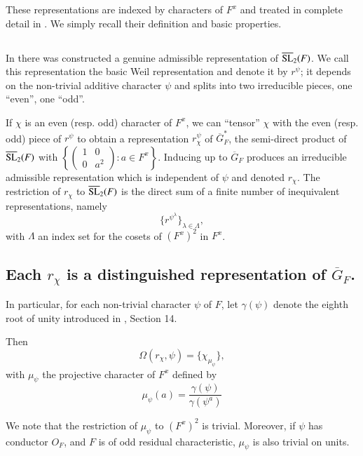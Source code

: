 These representations are indexed by characters of $F^{x}$ and treated in complete detail in \cite{Ge PS2}. We simply recall their definition and basic properties.

\subsection{}\label{art1-sec4.1}
In \cite{Weil} there was constructed a genuine admissible representation of $\overline{\mathrm{SL}}_{2}(F)$. We call this representation the basic Weil representation and denote it by $r^{\psi}$; it depends on the non-trivial additive character $\psi$ and splits into two irreducible pieces, one ``even'', one ``odd''.

If $\chi$ is an even (resp. odd) character of $F^{x}$, we can ``tensor'' $\chi$ with the even (resp. odd) piece of $r^{\psi}$ to obtain a representation $r^{\psi}_{\chi}$ of $\overline{G}_{F}^{*}$, the semi-direct product of $\overline{\mathrm{SL}}_{2}(F)$ with $\left\{\left(\begin{smallmatrix} 1 & 0\\ 0 & a^{2}\end{smallmatrix}\right):a\in F^{x}\right\}$. Inducing up to $\overline{G}_{F}$ produces an irreducible admissible representation which is independent of $\psi$ and denoted $r_{\chi}$. The restriction of $r_{\chi}$ to $\overline{\mathrm{SL}}_{2}(F)$ is the direct sum of a finite number of inequivalent representations, namely
$$
\{r^{\psi^{\lambda}}\}_{\lambda\in \Lambda},
$$
with $\Lambda$ an index set for the cosets of $(F^{x})^{2}$ in $F^{x}$.

\subsection{Each $r_{\chi}$ is a distinguished representation of $\overline{G}_{F}$.}\label{art1-sec4.2}
In particular, for each non-trivial character $\psi$ of $F$, let $\gamma(\psi)$ denote the eighth root of unity introduced in \cite{Weil}, Section 14.

Then
$$
\Omega(r_{\chi},\psi)=\{\chi_{\mu_{\psi}}\},
$$
with $\mu_{\psi}$ the projective character of $F^{x}$ defined by
\setcounter{equation}{0}
\begin{equation}
\mu_{\psi}(a)=\dfrac{\gamma(\psi)}{\gamma(\psi^{a})}\label{art1-eq4.2.1}
\end{equation}

We note that the restriction of $\mu_{\psi}$ to $(F^{x})^{2}$ is trivial. Moreover, if $\psi$ has conductor $O_{F}$, and $F$ is of odd residual characteristic, $\mu_{\psi}$ is also trivial on units.

